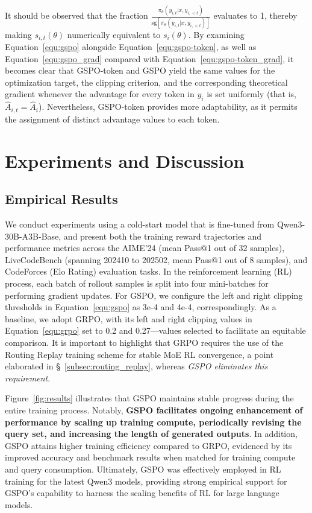 It should be observed that the fraction $\frac{ \pi_{\theta} (y_{i,t} | x, y_{i,<t}) }{ \mathrm{sg} \left[ \pi_{\theta} (y_{i,t} | x, y_{i,<t}) \right] }$ evaluates to 1, thereby making $s_{i,t}(\theta)$ numerically equivalent to $s_{i}(\theta)$. By examining Equation~\eqref{equ:gspo} alongside Equation~\eqref{equ:gspo-token}, as well as Equation~\eqref{equ:gspo_grad} compared with Equation~\eqref{equ:gspo-token_grad}, it becomes clear that GSPO-token and GSPO yield the same values for the optimization target, the clipping criterion, and the corresponding theoretical gradient whenever the advantage for every token in $y_i$ is set uniformly (that is, $\widehat{A}_{i,t} = \widehat{A}_{i}$). Nevertheless, GSPO-token provides more adaptability, as it permits the assignment of distinct advantage values to each token.

\section{Experiments and Discussion}

\subsection{Empirical Results}

We conduct experiments using a cold-start model that is fine-tuned from Qwen3-30B-A3B-Base, and present both the training reward trajectories and performance metrics across the AIME'24 (mean Pass@1 out of 32 samples), LiveCodeBench (spanning 202410 to 202502, mean Pass@1 out of 8 samples), and CodeForces (Elo Rating) evaluation tasks. In the reinforcement learning (RL) process, each batch of rollout samples is split into four mini-batches for performing gradient updates. For GSPO, we configure the left and right clipping thresholds in Equation~\eqref{equ:gspo} as 3e-4 and 4e-4, correspondingly. As a baseline, we adopt GRPO, with its left and right clipping values in Equation~\eqref{equ:grpo} set to 0.2 and 0.27—values selected to facilitate an equitable comparison. It is important to highlight that GRPO requires the use of the Routing Replay training scheme for stable MoE RL convergence, a point elaborated in \S~\ref{subsec:routing_replay}, whereas \textit{GSPO eliminates this requirement}.

Figure~\ref{fig:results} illustrates that GSPO maintains stable progress during the entire training process. Notably, \textbf{GSPO facilitates ongoing enhancement of performance by scaling up training compute, periodically revising the query set, and increasing the length of generated outputs}. In addition, GSPO attains higher training efficiency compared to GRPO, evidenced by its improved accuracy and benchmark results when matched for training compute and query consumption. Ultimately, GSPO was effectively employed in RL training for the latest Qwen3 models, providing strong empirical support for GSPO's capability to harness the scaling benefits of RL for large language models.

